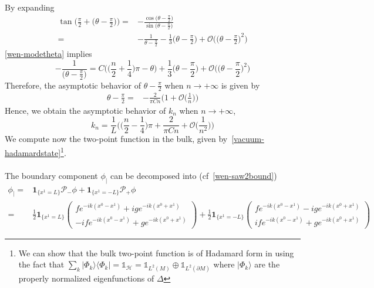 By expanding
\begin{equation*}
\begin{split}
\tan\Big(\frac{\pi}{2} + \big(\theta - \frac \pi 2 \big) \Big) = &
- \frac{\cos\big(\theta-\frac{\pi}{2}\big)}{\sin\big(\theta-\frac{\pi}{2}\big)} \\
= & 
-\frac{1}{\theta - \frac \pi 2 } - \frac{1}{3}\big(\theta - \frac{\pi}{2}\big) + \mathcal{O}\Big(\big(\theta - \frac \pi 2 \big)^2\Big)
\end{split}
\end{equation*}
\cref{wen-modetheta} implies
\begin{equation}\label{wen-modetheta2}
-\frac{1}{\big(\theta - \frac \pi 2\big)} = 
C\Big( \big(\frac n 2 + \frac 1 4 \big)\pi - \theta \Big) +  \frac{1}{3}\big(\theta - \frac{\pi}{2}\big) + \mathcal{O}\Big(\big(\theta - \frac \pi 2 \big)^2\Big)
\end{equation}
Therefore,
the asymptotic behavior of $\theta-\frac \pi 2$ when $n\rightarrow + \infty$ is given by
\begin{equation*}
\begin{split}
\theta - \frac{\pi}{ 2} = &  -\frac{2}{\pi C n}\Big( 1 + \mathcal{O}\big( \frac{ 1}{ n}\big) \Big)
\end{split}
\end{equation*}
Hence, we obtain the asymptotic behavior of $k_n$ when $n\rightarrow +\infty$, 
\begin{equation*}
k_n = \frac 1 L \Big( \big( \frac n 2 - \frac 1 4 \big)\pi + \frac{2}{\pi C n}+ \mathcal{O}\big(\frac{1}{n^2}\big) \Big)
\end{equation*}
We compute now the two-point function in the bulk, given by~\cref{vacuum-hadamardstate}\footnote{
We can show that the bulk two-point function is of Hadamard form in using the fact that $\sum_{k}|\Phi_k\rangle\langle\Phi_k| = \mathbb{1}_{\mathcal{H}} = \mathbb{1}_{L^2(M)}\oplus\mathbb{1}_{L^2(\partial M)}$ where $|\Phi_k\rangle$ are the properly normalized eigenfunctions of $\Delta$ 
}.\\\\
%
The boundary component $\phi_|$ can be decomposed into (cf~\cref{wen-saw2bound})
\begin{equation*}
\begin{split}
\phi_| = & \mathbf{1}_{\{x^1 = L\}} \mathcal{P}_-\phi + \mathbf{1}_{\{x^1 = -L\}} \mathcal{P}_+\phi \\
%
= & \frac 1 2 \mathbf{1}_{\{x^1 = L\} } \begin{pmatrix} f e^{-ik(x^0 -x^1)} + ig e^{-ik(x^0 + x^1)} \\
-if e^{-ik(x^0 - x^1)} + g e^{-ik(x^0+x^1)}\end{pmatrix}
+ \frac 1 2 \mathbf{1}_{\{x^1 = - L\} } \begin{pmatrix} f e^{-ik(x^0 -x^1)} - ig e^{-ik(x^0 + x^1)} \\
if e^{-ik(x^0 - x^1)} + g e^{-ik(x^0+x^1)}\end{pmatrix} 
\end{split}
\end{equation*}
